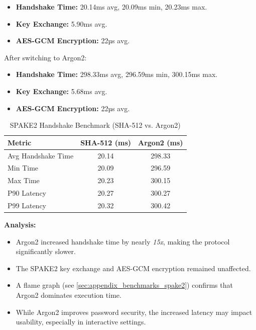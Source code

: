 \documentclass[twoside,a4paper,12pt]{article}
\begin{document}
\begin{itemize}
    \item \textbf{Handshake Time:} 20.14ms avg, 20.09ms min, 20.23ms max.
    \item \textbf{Key Exchange:} 5.90ms avg.
    \item \textbf{AES-GCM Encryption:} 22µs avg.
\end{itemize}
    
{After switching to Argon2:}
\begin{itemize}
    \item \textbf{Handshake Time:} 298.33ms avg, 296.59ms min, 300.15ms max.
    \item \textbf{Key Exchange:} 5.68ms avg.
    \item \textbf{AES-GCM Encryption:} 22µs avg.
\end{itemize}
    
\begin{table}[H]
    \centering
    \label{tab:spake2_benchmark}
    \renewcommand{\arraystretch}{1.2}
    \begin{tabular}{lcc}
        \toprule
        \textbf{Metric} & \textbf{SHA-512 (ms)} & \textbf{Argon2 (ms)} \\
        \midrule
        Avg Handshake Time & 20.14 & 298.33 \\
        Min Time & 20.09 & 296.59 \\
        Max Time & 20.23 & 300.15 \\
        P90 Latency & 20.27 & 300.27 \\
        P99 Latency & 20.32 & 300.42 \\
        \bottomrule
    \end{tabular}
    \caption{SPAKE2 Handshake Benchmark (SHA-512 vs. Argon2)}
\end{table}

\textbf{Analysis:}
\begin{itemize}
    \item Argon2 increased handshake time by nearly \textit{15x}, making the protocol significantly slower.
    \item The SPAKE2 key exchange and AES-GCM encryption remained unaffected.
    \item A flame graph (see \autoref{sec:appendix_benchmarks_spake2}) confirms that Argon2 dominates execution time.
    \item While Argon2 improves password security, the increased latency may impact usability, especially in interactive settings.
\end{itemize}
    
\end{document}
